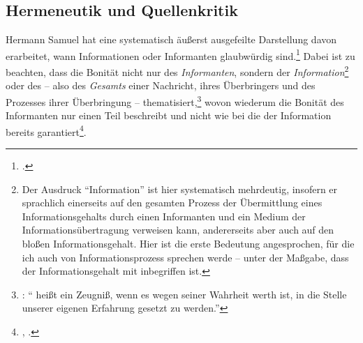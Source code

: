 \subsection{Hermeneutik und
Quellenkritik}\label{subsubsection:HermannSamuelReimarus} Hermann Samuel
hat eine systematisch äußerst ausgefeilte Darstellung davon erarbeitet, wann
Informationen oder Informanten glaubwürdig
sind.\footnote{\cite[Vgl.][\S\S~239--258]{Reimarus:DieVernunftlehrealseineAnweisungzumrichtigenGebrauchderVernunftinderErkenntnisderWahrheit1756}.}
Dabei ist zu beachten, dass
die Bonität nicht nur des \emph{Informanten}, sondern der
\emph{Information}\footnote{Der Ausdruck \enquote{Information} ist hier
systematisch mehrdeutig, insofern er sprachlich einerseits auf den gesamten
Prozess der Übermittlung eines Informationsgehalts durch einen Informanten und
ein Medium der Informationsübertragung verweisen kann, andererseits aber auch
auf den bloßen Informationsgehalt. Hier ist die erste Bedeutung angesprochen,
für die ich auch von Informationsprozess sprechen werde -- unter der Maßgabe,
dass der Informationsgehalt mit inbegriffen ist.} oder des
 -- also des \emph{Gesamts} einer Nachricht, ihres
Überbringers und des Prozesses ihrer Überbringung --
thematisiert,\footnote{\cite[Vgl.][\S~239]{Reimarus:DieVernunftlehrealseineAnweisungzumrichtigenGebrauchderVernunftinderErkenntnisderWahrheit1756}:
\enquote{ heißt ein Zeugniß, wenn es wegen seiner Wahrheit
werth ist, in die Stelle unserer eigenen Erfahrung gesetzt zu werden.}} wovon
wiederum die Bonität des Informanten nur einen Teil beschreibt und nicht wie bei
 die der Information bereits
garantiert\footnote{\cite[Vgl.][\S~214]{Meier:AuszugausderVernunftlehre1752},
\cite[][XVI: 509.22--23]{Kant:GesammelteWerke1900ff.}.}.



